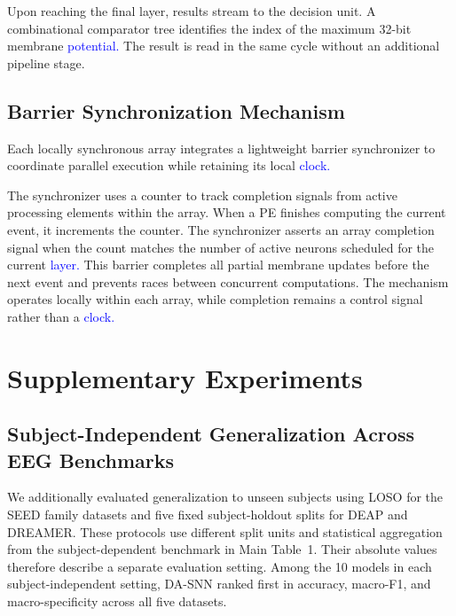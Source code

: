 \documentclass[12pt]{article}
\newcommand{\rev}[1]{\textcolor{blue}{#1}}
\begin{document}
Upon reaching the final layer, results stream to the decision unit. A combinational comparator tree identifies the index of the maximum 32-bit membrane \rev{potential.} The result is read in the same cycle without an additional pipeline stage.

\subsection{Barrier Synchronization Mechanism}

Each locally synchronous array integrates a lightweight barrier synchronizer to coordinate parallel execution while retaining its local \rev{clock.}

The synchronizer uses a counter to track completion signals from active processing elements within the array. When a PE finishes computing the current event, it increments the counter. The synchronizer asserts an array completion signal when the count matches the number of active neurons scheduled for the current \rev{layer.} This barrier completes all partial membrane updates before the next event and prevents races between concurrent computations. The mechanism operates locally within each array, while completion remains a control signal rather than a \rev{clock.}
\section{Supplementary Experiments}

\subsection{ Subject-Independent Generalization Across EEG Benchmarks}\label{supp:cross_subject}


We additionally evaluated generalization to unseen subjects using LOSO for the SEED family datasets and five fixed subject-holdout splits for DEAP and DREAMER. These protocols use different split units and statistical aggregation from the subject-dependent benchmark in Main Table~1. Their absolute values therefore describe a separate evaluation setting. Among the 10 models in each subject-independent setting, DA-SNN ranked first in accuracy, macro-F1, and macro-specificity across all five datasets.
\end{document}
